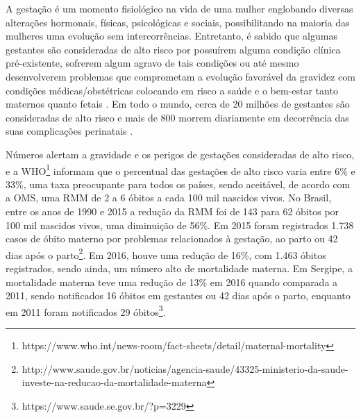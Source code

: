 \acresetall 

A gestação é um momento fisiológico na vida de uma mulher englobando diversas alterações hormonais, físicas, psicológicas e sociais, possibilitando na maioria das mulheres uma evolução sem intercorrências. Entretanto, é sabido que algumas gestantes são consideradas de alto risco por possuírem alguma condição clínica pré-existente, sofrerem algum agravo de tais condições ou até mesmo desenvolverem problemas que comprometam a evolução favorável da gravidez com condições médicas/obstétricas colocando em risco a saúde e o bem-estar tanto maternos quanto fetais \cite{melo2016,holness2018}. Em todo o mundo, cerca de 20 milhões de gestantes são consideradas de alto risco e mais de 800 morrem diariamente em decorrência das suas complicações perinatais \cite{bayrampour2013,lee2014,rodrigues2016}. 

Números alertam a gravidade e os perigos de gestações consideradas de alto risco,  e a  \ac{WHO}\footnote{https://www.who.int/news-room/fact-sheets/detail/maternal-mortality} informam que o percentual das gestações de alto risco varia entre 6\% e 33\%, uma taxa preocupante para todos os países, sendo aceitável, de acordo com a \ac{OMS}, uma \ac{RMM} de 2 a 6 óbitos a cada 100 mil nascidos vivos. No Brasil, entre os anos de 1990 e 2015 a redução da \ac{RMM} foi de 143 para 62 óbitos por 100 mil nascidos vivos, uma diminuição de 56\%. Em 2015 foram registrados 1.738 casos de óbito materno por problemas relacionados à gestação, ao parto ou 42 dias após o parto\footnote{http://www.saude.gov.br/noticias/agencia-saude/43325-ministerio-da-saude-investe-na-reducao-da-mortalidade-materna}. Em 2016, houve uma redução de 16\%, com 1.463 óbitos registrados, sendo ainda, um número alto de mortalidade materna. Em Sergipe, a mortalidade materna teve uma redução de 13\% em 2016 quando comparada a 2011, sendo notificados 16 óbitos em gestantes ou 42 dias após o parto, enquanto em 2011 foram notificados 29 óbitos\footnote{https://www.saude.se.gov.br/?p=3229}. 

